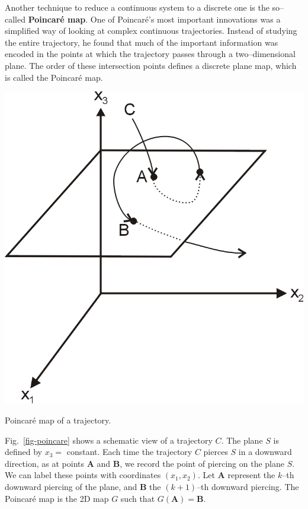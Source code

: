 Another technique to reduce a continuous system to a discrete one is the so--called \textbf{Poincar\'{e} map}. One of Poincar\'{e}'s most important innovations was a simplified way of looking at complex continuous trajectories. Instead of studying the entire trajectory, he found that much of the important information was encoded in the points at which the trajectory passes through a two--dimensional plane. The order of these intersection points defines a discrete plane map, which is called the Poincar\'{e} map. 

\begin{marginfigure}
\centering
\includegraphics{dynamic/figures/poincare}
\caption{Poincar\'{e} map of a trajectory.}
\label{fig-poincare}
\end{marginfigure}

Fig.~\ref{fig-poincare} shows a schematic view of a trajectory $C$. The plane $S$ is defined by $x_3=$ constant. Each time the trajectory $C$ pierces $S$ in a downward direction, as at points ${\mathbf A}$ and ${\mathbf B}$, we record the point of piercing on the plane $S$. We can label these points with coordinates $(x_1,x_2)$. Let ${\mathbf A}$ represent the $k$--th downward piercing of the plane, and ${\mathbf B}$ the $(k+1)$--th downward piercing. The Poincar\'{e} map is the 2D map $G$ such that $G({\mathbf A}) = {\mathbf B}$.

